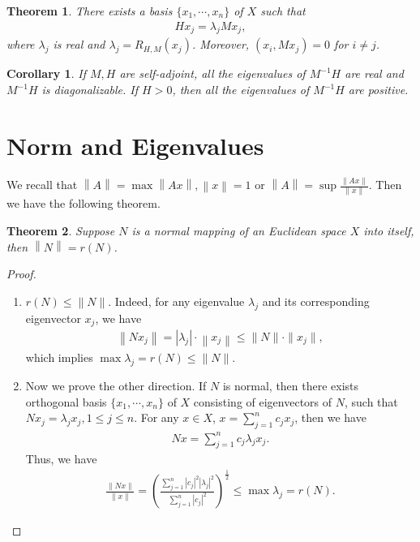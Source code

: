 \documentclass[11pt]{book}
\newtheorem{theorem}{Theorem}[chapter]
\newtheorem{corollary}{Corollary}[theorem]
\theoremstyle{definition}
\numberwithin{equation}{chapter}
\begin{document}
\medskip

\begin{theorem}
There exists a basis $\{x_1,\cdots,x_n\}$ of $X$ such that 
\begin{align*}
    Hx_j = \lambda_j M x_j, 
\end{align*}
where $\lambda_j$ is real and $\lambda_j = R_{H,M}(x_j)$. Moreover, $\left(x_i, Mx_j\right) = 0$ for $i\neq j$.
\end{theorem}

\medskip

\begin{corollary}
If $M,H$ are self-adjoint, all the eigenvalues of $M^{-1}H$ are real and $M^{-1}H$ is diagonalizable. If $H > 0$, then all the eigenvalues of $M^{-1}H$ are positive.
\end{corollary}

\medskip

\section{Norm and Eigenvalues}

We recall that $\left\|A\right\| = \max \left\|Ax\right\|, \left\|x\right\|=1$ or $\left\|A\right\| = \sup\frac{\|Ax\|}{\|x\|}$. Then we have the following theorem.

\medskip

\begin{theorem}
Suppose $N$ is a normal mapping of an Euclidean space $X$ into itself, then $\left\|N\right\| = r(N)$.
\end{theorem}
\begin{proof}
~\begin{enumerate}[label=(\alph*)]
    \item $r(N)\leq \|N\|$. Indeed, for any eigenvalue $\lambda_j$ and its corresponding eigenvector $x_j$, we have \begin{align*}
        \left\|Nx_j\right\| = |\lambda_j|\cdot \left\|x_j\right\|\leq \|N\|\cdot \|x_j\|,
    \end{align*}
    which implies $\max \lambda_j = r(N) \leq \|N\|$.
    \item Now we prove the other direction. If $N$ is normal, then there exists orthogonal basis $\{x_1,\cdots, x_n\}$ of $X$ consisting of eigenvectors of $N$, such that $Nx_j = \lambda_j x_j, 1\leq j\leq n$. For any $x\in X$, $x = \sum^n_{j=1}c_j x_j$, then we have
    \begin{align*}
        Nx = \sum^n_{j=1}c_j\lambda_j x_j.
    \end{align*}
    Thus, we have
    \begin{align*}
        \frac{\|Nx\|}{\|x\|} = \left(\frac{\sum^n_{j=1} |c_j|^2 |\lambda_j|^2}{\sum^n_{j=1} |c_j|^2}\right)^{\frac{1}{2}} \leq \max \lambda_j = r(N).
    \end{align*}
\end{enumerate}
\end{proof}
\end{document}
